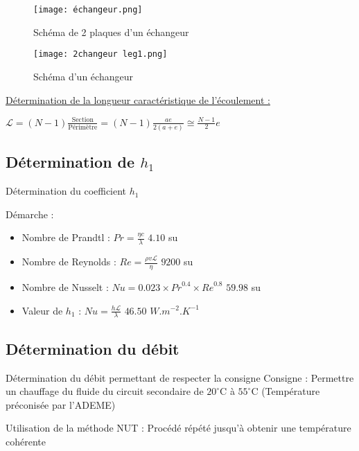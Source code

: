 \documentclass[hyperref={pdfpagelabels=false}]{beamer}
\begin{document}
\begin{frame}
\begin{figure}[!htb]
  \begin{minipage}[b]{0.45\linewidth}
    \centering
    \texttt{[image: échangeur.png]}
    \caption{Schéma de 2 plaques d'un échangeur}
    \label{fig:label-1}
  \end{minipage}
  \hfill
  \begin{minipage}[b]{0.45\linewidth}
    \centering
    \texttt{[image: 2changeur leg1.png]}
    \caption{Schéma d'un échangeur}
    \label{fig:label-2}
  \end{minipage}
\end{figure}
\underline{Détermination de la longueur caractéristique de l'écoulement :}\par
$ \mathcal{L} = (N-1) \frac{\text{Section}}{\text{Périmètre}} = (N-1) \frac{ae}{2(a+e)}\cong \frac{N-1}{2} e$ \par
\end{frame}


\subsection*{Détermination de $h_1$}\label{e22}
\begin{frame}{Détermination du coefficient $h_1$ {\textcolor{ultramarine}{\hyperlink{a52}{}}} }

Démarche :
\begin{itemize}
\item Nombre de Prandtl : $Pr = \frac{\eta c}{\lambda}$  {\color{ultramarine} $4.10$ su}
\item Nombre de Reynolds : $Re = \frac{\rho v \mathcal{L}}{\eta}$ {\color{ultramarine} $9200$ su}
\item Nombre de Nusselt : $Nu = 0.023\times {Pr}^{0.4} \times {Re}^{0.8}$ {\color{ultramarine} $59.98$ su}
\item Valeur de $h_1$ : $Nu = \frac{h \mathcal{L}}{\lambda}$ {\color{ultramarine} $ 46.50$ $W.m^{-2}.K^{-1}$}
\end{itemize}
\end{frame}

\subsection*{Détermination du débit}\label{e23}
\begin{frame}{Détermination du débit permettant de respecter la consigne {\textcolor{ultramarine}{\hyperlink{a52}{}}} }
Consigne : Permettre un chauffage du fluide du circuit secondaire de $20^{\circ}$C à $55^{\circ}$C (Température préconisée par l'ADEME) \par

Utilisation de la méthode NUT :
Procédé répété jusqu'à obtenir une température cohérente 
\end{frame}
\end{document}
